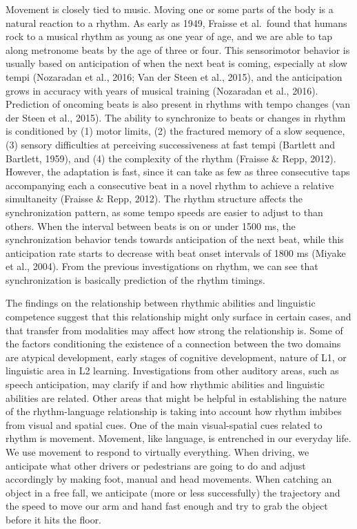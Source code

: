 \documentclass[english,man]{apa6}
\begin{document}
Movement is closely tied to music. Moving one or some parts of the body is a natural reaction to a rhythm. As early as 1949, Fraisse et al.~found that humans rock to a musical rhythm as young as one year of age, and we are able to tap along metronome beats by the age of three or four. This sensorimotor behavior is usually based on anticipation of when the next beat is coming, especially at slow tempi (Nozaradan et al., 2016; Van der Steen et al., 2015), and the anticipation grows in accuracy with years of musical training (Nozaradan et al., 2016). Prediction of oncoming beats is also present in rhythms with tempo changes (van der Steen et al., 2015). The ability to synchronize to beats or changes in rhythm is conditioned by (1) motor limits, (2) the fractured memory of a slow sequence, (3) sensory difficulties at perceiving successiveness at fast tempi (Bartlett and Bartlett, 1959), and (4) the complexity of the rhythm (Fraisse \& Repp, 2012). However, the adaptation is fast, since it can take as few as three consecutive taps accompanying each a consecutive beat in a novel rhythm to achieve a relative simultaneity (Fraisse \& Repp, 2012). The rhythm structure affects the synchronization pattern, as some tempo speeds are easier to adjust to than others. When the interval between beats is on or under 1500 ms, the synchronization behavior tends towards anticipation of the next beat, while this anticipation rate starts to decrease with beat onset intervals of 1800 ms (Miyake et al., 2004). From the previous investigations on rhythm, we can see that synchronization is basically prediction of the rhythm timings.

The findings on the relationship between rhythmic abilities and linguistic competence suggest that this relationship might only surface in certain cases, and that transfer from modalities may affect how strong the relationship is. Some of the factors conditioning the existence of a connection between the two domains are atypical development, early stages of cognitive development, nature of L1, or linguistic area in L2 learning. Investigations from other auditory areas, such as speech anticipation, may clarify if and how rhythmic abilities and linguistic abilities are related. Other areas that might be helpful in establishing the nature of the rhythm-language relationship is taking into account how rhythm imbibes from visual and spatial cues. One of the main visual-spatial cues related to rhythm is movement. Movement, like language, is entrenched in our everyday life. We use movement to respond to virtually everything. When driving, we anticipate what other drivers or pedestrians are going to do and adjust accordingly by making foot, manual and head movements. When catching an object in a free fall, we anticipate (more or less successfully) the trajectory and the speed to move our arm and hand fast enough and try to grab the object before it hits the floor.
\end{document}

